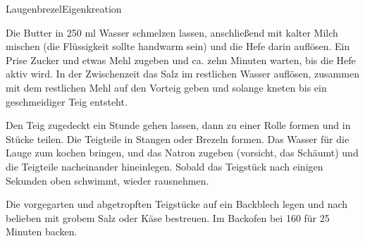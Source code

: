 \begin{recipe}{Laugenbrezel}{Eigenkreation}
  \label{Laugenbrezel}
  \inglist[Teig]

  \inglist[Lauge]

  \steps

  Die Butter in 250 ml Wasser schmelzen lassen, anschließend mit kalter Milch
  mischen (die Flüssigkeit sollte handwarm sein) und die Hefe darin auflösen.
  Ein Prise Zucker und etwas Mehl zugeben und ca. zehn Minuten warten, bis die
  Hefe aktiv wird. In der Zwischenzeit das Salz im restlichen Wasser auflösen,
  zusammen mit dem restlichen Mehl auf den Vorteig geben und solange kneten bis
  ein geschmeidiger Teig entsteht.

  Den Teig zugedeckt ein Stunde gehen lassen, dann zu einer Rolle formen und in
  Stücke teilen. Die Teigteile in Stangen oder Brezeln formen. Das Wasser für
  die Lauge zum kochen bringen, und das Natron zugeben (vorsicht, das Schäumt)
  und die Teigteile nacheinander hineinlegen. Sobald das Teigstück nach einigen
  Sekunden oben schwimmt, wieder rausnehmen.

  Die vorgegarten und abgetropften Teigstücke auf ein Backblech legen und
  nach belieben mit grobem Salz oder Käse bestreuen. Im Backofen bei 160
  \celsius für 25 Minuten backen.

\end{recipe}
